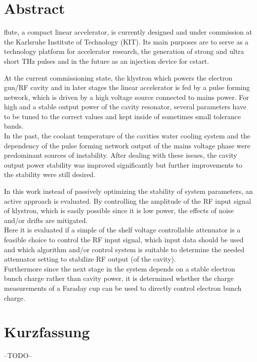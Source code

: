 \section*{Abstract}
\gls{flute}, a compact linear accelerator, is currently designed and under commission at the Karlsruhe Institute of Technology (KIT). Its main purposes are to serve as a technology platform for accelerator research, the generation of strong and ultra short THz pulses and in the future as an injection device for \gls{cstart}.

At the current commissioning state, the klystron which powers the electron gun/RF cavity and in later stages the linear accelerator is fed by a pulse forming network, which is driven by a high voltage source connected to mains power. For high and a stable output power of the cavity resonator, several parameters have to be tuned to the correct values and kept inside of sometimes small tolerance bands.\\
In the past, the coolant temperature of the cavities water cooling system and the dependency of the pulse forming network output of the mains voltage phase were predominant sources of instability. After dealing with these issues, the cavity output power stability was improved significantly but further improvements to the stability were still desired.

In this work instead of passively optimizing the stability of system parameters, an active approach is evaluated. By controlling the amplitude of the RF input signal of klystron, which is easily possible since it is low power, the effects of noise and/or drifts are mitigated.\\
Here it is evaluated if a simple of the shelf voltage controllable attenuator is a feasible choice to control the RF input signal, which input data should be used and which algorithm and/or control system is suitable to determine the needed attenuator setting to stabilize RF output (of the cavity).\\
Furthermore since the next stage in the system depends on a stable electron bunch charge rather than cavity power, it is determined whether the charge measurements of a Faraday cup can be used to directly control electron bunch charge.

\section*{Kurzfassung}
--TODO--
